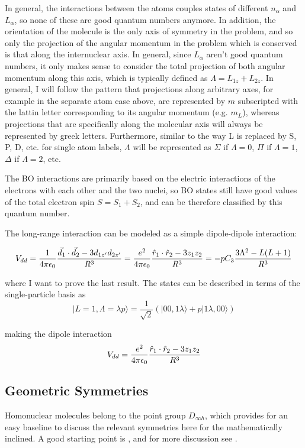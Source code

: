\documentclass[prl, longbibliography]{revtex4-2}
\begin{document}
In general, the interactions between the atoms couples states of different $n_\alpha$ and $L_\alpha$, so none of these are good quantum numbers anymore. In addition, the orientation of the molecule is the only axis of symmetry in the problem, and so only the projection of the angular momentum in the problem which is conserved is that along the internuclear axis. 
In general, since $L_\alpha$ aren't good quantum numbers, it only makes sense to consider the total projection of both angular momentum along this axis, which is typically defined as $\Lambda=L_{1z}+L_{2z}$. 
In general, I will follow the pattern that projections along arbitrary axes, for example in the separate atom case above, are represented by $m$ subscripted with the lattin letter corresponding to its angular momentum (e.g. $m_L$), whereas projections that are specifically along the molecular axis will always be represented by greek letters.
Furthermore, similar to the way L is replaced by S, P, D, etc. for single atom labels, $\Lambda$ will be represented as $\Sigma$ if $\Lambda=0$, $\Pi$ if $\Lambda=1$, $\Delta$ if $\Lambda=2$, etc.

The BO interactions are primarily based on the electric interactions of the electrons with each other and the two nuclei, so BO states still have good values of the total electron spin $S=S_1+S_2$, and can be therefore classified by this quantum number.

The long-range interaction can be modeled as a simple dipole-dipole interaction:

$$
V_{dd} = \frac{1}{4\pi\epsilon_0} \frac{\vec{d}_1\cdot\vec{d}_2-3d_{1z'}d_{2z'}}{R^3} \\
=\frac{e^2}{4\pi\epsilon_0} \frac{\hat{r}_1\cdot\hat{r}_2-3z_{1}z_{2}}{R^3} \\
= -pC_3\frac{3\Lambda^2-L(L+1)}{R^3}
$$

where I want to prove the last result. The states can be described in terms of the single-particle basis as
$$
|L=1,\Lambda=\lambda p\rangle= \frac{1}{\sqrt{2}} (|00,1\lambda\rangle+p|1\lambda,00\rangle)
$$

making the dipole interaction
$$
V_{dd} = \frac{e^2}{4\pi\epsilon_0} \frac{\hat{r}_1\cdot\hat{r}_2-3z_{1}z_{2}}{R^3} \\
$$
\subsection{Geometric Symmetries}

Homonuclear molecules belong to the point group $D_{\infty h}$, which provides for an easy baseline to discuss the relevant symmetries here for the mathematically inclined. A good starting point is \cite{hougen_calculation_2001}, and for more discussion see \cite{lefebvre-brion_perturbations_1986}. 
\end{document}
